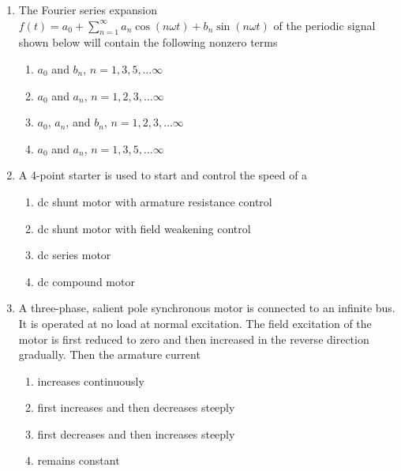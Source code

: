 \documentclass[journal,9pt,onecolumn]{IEEEtran}
\begin{document}
\begin{enumerate}
\item The Fourier series expansion $f(t) = a_0 + \sum_{n=1}^{\infty} a_n \cos(n \omega t) + b_n \sin(n \omega t)$ of the periodic signal shown below will contain the following nonzero terms
\begin{center}
    
\end{center}
\begin{multicols}{2}
    \begin{enumerate}
        \item $a_0$ and $b_n$, $n=1,3,5, \ldots \infty$
        \item $a_0$ and $a_n$, $n=1,2,3, \ldots \infty$
        \item $a_0$, $a_n$, and $b_n$, $n=1,2,3, \ldots \infty$
        \item $a_0$ and $a_n$, $n=1,3,5, \ldots \infty$
    \end{enumerate}
\end{multicols}

\item A 4-point starter is used to start and control the speed of a
    \begin{enumerate}
        \item dc shunt motor with armature resistance control
        \item dc shunt motor with field weakening control
        \item dc series motor
        \item dc compound motor
    \end{enumerate}

\item A three-phase, salient pole synchronous motor is connected to an infinite bus. It is operated at no load at normal excitation. The field excitation of the motor is first reduced to zero and then increased in the reverse direction gradually. Then the armature current
\begin{multicols}{2}
    \begin{enumerate}
        \item increases continuously
        \item first increases and then decreases steeply
        \item first decreases and then increases steeply
        \item remains constant
    \end{enumerate}
\end{multicols}


\end{enumerate}
\end{document}
